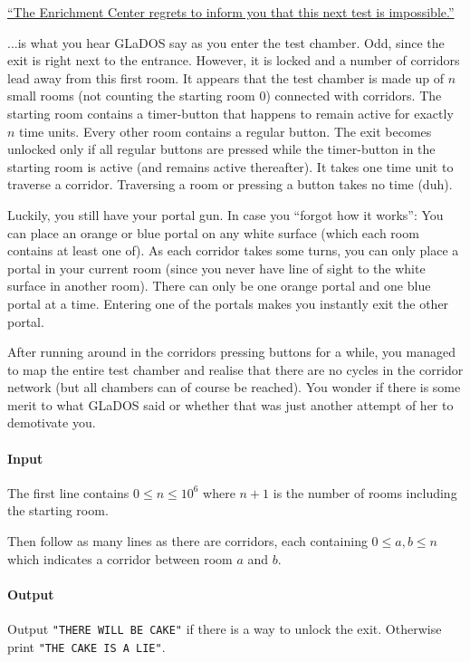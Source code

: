 




\href{https://i1.theportalwiki.net/img/d/d0/GLaDOS_05_part1_entry-1.wav}{``The Enrichment Center regrets to inform you that this next test is impossible.''}

...is what you hear GLaDOS say as you enter the test chamber. Odd, since the exit is right next to the entrance. However, it is locked and a number of corridors lead away from this first room. It appears that the test chamber is made up of $n$ small rooms (not counting the starting room $0$) connected with corridors. The starting room contains a timer-button that happens to remain active for exactly $n$ time units. Every other room contains a regular button. The exit becomes unlocked only if all regular buttons are pressed while the timer-button in the starting room is active (and remains active thereafter). It takes one time unit to traverse a corridor. Traversing a room or pressing a button takes no time (duh).

Luckily, you still have your portal gun. In case you ``forgot how it works'': You can place an orange or blue portal on any white surface (which each room contains at least one of). As each corridor takes some turns, you can only place a portal in your current room (since you never have line of sight to the white surface in another room). There can only be one orange portal and one blue portal at a time. Entering one of the portals makes you instantly exit the other portal.

After running around in the corridors pressing buttons for a while, you managed to map the entire test chamber and realise that there are no cycles in the corridor network (but all chambers can of course be reached). You wonder if there is some merit to what GLaDOS said or whether that was just another attempt of her to demotivate you.

\paragraph*{Input}

The first line contains $0\leq n\leq 10^6$ where $n+1$ is the number of rooms including the starting room.

Then follow as many lines as there are corridors, each containing $0 \leq a,b \leq n$ which indicates a corridor between room $a$ and $b$.

\paragraph*{Output}

Output \texttt{"THERE WILL BE CAKE"} if there is a way to unlock the exit. Otherwise print \texttt{"THE CAKE IS A LIE"}.

\begin{samples}
\end{samples}


